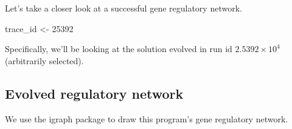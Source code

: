 \documentclass[
]{book}
\newenvironment{Shaded}{\begin{snugshade}}{\end{snugshade}}
\newcommand{\DecValTok}[1]{\textcolor[rgb]{0.00,0.00,0.81}{#1}}
\newcommand{\NormalTok}[1]{#1}
\newcommand{\StringTok}[1]{\textcolor[rgb]{0.31,0.60,0.02}{#1}}
\begin{document}
Let's take a closer look at a successful gene regulatory network.

\begin{Shaded}
\begin{Highlighting}[]
\NormalTok{trace\_id \textless{}{-}}\StringTok{ }\DecValTok{25392}
\end{Highlighting}
\end{Shaded}

Specifically, we'll be looking at the solution evolved in run id \ensuremath{2.5392\times 10^{4}} (arbitrarily selected).

\hypertarget{evolved-regulatory-network-3}{%
\subsection{Evolved regulatory network}\label{evolved-regulatory-network-3}}

We use the igraph package to draw this program's gene regulatory network.
\end{document}
